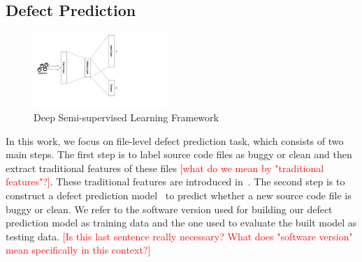 \subsection{Defect Prediction}
\label{sec:defect_prediction}
\begin{figure}
	\centering
	\includegraphics[width=0.45\textwidth]{dssl_framework}
	\caption{Deep Semi-supervised Learning Framework}
	\label{fig:semi_framework}
\end{figure}



In this work, we focus on file-level defect prediction task, which consists of two main steps. The first step is to label source code files as buggy or clean and then extract traditional features of these files \textcolor{red}{[what do we mean by "traditional features"?]}. These traditional features are introduced in~\cite{wang2016automatically, mccabe1976complexity, chakradeo2013mast}. The second step is to construct a defect prediction model~\cite{bishop2006pattern} to predict whether a new source code file is buggy or clean.  We refer to the software version used for building our defect prediction model as training data and the one used to evaluate the built model as testing data. \textcolor{red}{[Is this last sentence really necessary? What does "software version" mean specifically in this context?]}

